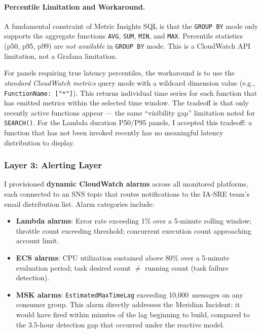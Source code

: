 \paragraph{Percentile Limitation and Workaround.}
A fundamental constraint of Metric Insights SQL is that the
\texttt{GROUP BY} mode only supports the aggregate functions
\texttt{AVG}, \texttt{SUM}, \texttt{MIN}, and \texttt{MAX}. Percentile
statistics (p50, p95, p99) are \emph{not
available} in \texttt{GROUP BY} mode. This is a CloudWatch API limitation,
not a Grafana limitation.

For panels requiring true latency percentiles, the workaround is to use
the \emph{standard CloudWatch metrics} query mode with a wildcard
dimension value (e.g., \texttt{FunctionName: ["*"]}). This returns
individual time series for each function that has emitted metrics within
the selected time window. The tradeoff is that only recently active functions
appear --- the same ``visibility gap'' limitation noted for \texttt{SEARCH()}.
For the Lambda duration P50/P95 panels, I accepted this tradeoff:
a function that has not been invoked recently has no meaningful latency
distribution to display.

\subsubsection{Layer 3: Alerting Layer}

I provisioned \textbf{dynamic CloudWatch alarms} across all monitored
platforms, each connected to an SNS topic that routes notifications to
the IA-SRE team's email distribution list. Alarm categories include:

\begin{itemize}
    \item \textbf{Lambda alarms}: Error rate exceeding 1\% over a
          5-minute rolling window; throttle count exceeding threshold;
          concurrent execution count approaching account limit.

    \item \textbf{ECS alarms}: CPU utilization sustained above 80\%
          over a 5-minute evaluation period; task desired count $\neq$
          running count (task failure detection).

    \item \textbf{MSK alarms}: \texttt{EstimatedMaxTimeLag} exceeding
          10,000~messages on any consumer group. This alarm directly
          addresses the Meridian Incident: it would have fired within
          minutes of the lag beginning to build, compared to the 3.5-hour
          detection gap that occurred under the reactive model.
\end{itemize}

